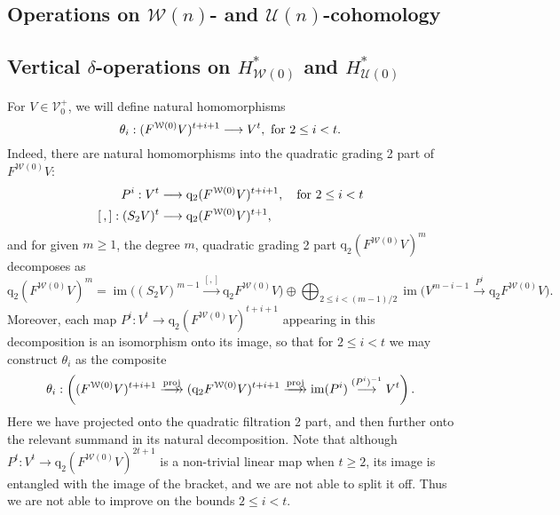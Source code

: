 \documentclass[11pt]{amsart} \renewcommand{\baselinestretch}{1.2}
\theoremstyle{plain}
\numberwithin{equation}{section} %
\theoremstyle{plain}
\numberwithin{equation}{chapter} %
\DeclareMathOperator{\Hom}{Hom}
\DeclareMathOperator{\im}{im}
\renewcommand{\to}{\longrightarrow}
\newcommand{\calU}{\mathcal{U}}
\newcommand{\calV}{\mathcal{V}}
\newcommand{\calw}{\mathcal{W}}
\newcommand{\vect}[2]{\calV^{#1}_{#2}}
\newcommand{\quadgrad}[1]{\mathrm{q}_{#1}}
\newcommand{\F}{\mathbb{F}}
\newcommand{\Ftwo}{\F_2}
\newcommand{\SectionOrChapter}[1]{\section{\textbf{#1}}}
\newcommand{\SubsectionOrSection}[1]{\subsection{#1}}
\begin{document}
\begin{Cohomology Operations for W and U}
\SectionOrChapter{Operations on $\calw(n)$- and $\calU(n)$-cohomology}
\label{Cohomology Operations for W and U}



\SubsectionOrSection{Vertical $\delta$-operations on $H^*_{\calw(0)}$ and $H^*_{\calU(0)}$}
For $V\in \vect{+}{0}$, we will define natural homomorphisms
\[\theta_i:(F^{\calw(0)}V)^{t+i+1}\to V^{t}, \textup{ for $2\leq i<t$}.\]
Indeed, there are natural homomorphisms into the quadratic grading 2 part of $F^{\calw(0)}V$:
\begin{align*}
P^i:V^{t}&\to \quadgrad{2}(F^{\calw(0)}V)^{t+i+1}, \textup{\quad  for $2\leq i<t$}\\
[\,,]:(S_2V)^{t}&\to \quadgrad{2}(F^{\calw(0)}V)^{t+1},
\end{align*}
and for given $m\geq1$, the degree $m$, quadratic grading 2 part $\quadgrad{2}(F^{\calw(0)}V)^m$ decomposes as
%
\[\quadgrad{2}(F^{\calw(0)}V)^{m}=%
\im \bigl((S_2V)^{m-1}\overset{[,]}{\to} \quadgrad{2}F^{\calw(0)}V\bigr)%
\oplus\bigoplus_{\!\!\!\!\!\!2\leq i< (m-1)/2\!\!\!\!\!\!}\im \bigl(V^{m-i-1}\overset{P^i}{\to}\quadgrad{2}F^{\calw(0)}V\bigr).\]
Moreover, each map $P^i:V^t\to \quadgrad{2}(F^{\calw(0)}V)^{t+i+1}$ appearing in this decomposition is an isomorphism onto its image, so that for $2\leq i <t$ we may construct $\theta_i$ as the composite
\[\theta_i:\left((F^{\calw(0)}V)^{t+i+1}\overset{\textup{proj}}{\makebox[.06ex][l]{$\to$}\to} (\quadgrad{2}F^{\calw(0)}V)^{t+i+1}\overset{\textup{proj}}{\makebox[.06ex][l]{$\to$}\to} \im (P^i)\overset{(P^i)^{-1}}{\to}V^{t}\right).\]
Here we have projected onto the quadratic filtration 2 part, and then further onto the relevant summand in its natural decomposition. Note that although $P^t:V^t\to \quadgrad{2}(F^{\calw(0)}V)^{2t+1}$ is a non-trivial linear map when $t\geq2$, its image is entangled with the image of the bracket, and we are not able to split it off. Thus we are not able to improve on the bounds $2\leq i< t$.

\end{Cohomology Operations for W and U}
\end{document}
